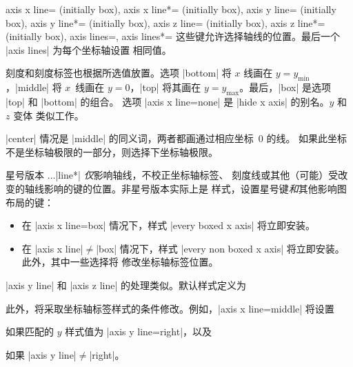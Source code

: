\begin{pgfplotskeylist}{%
    axis x line= (initially box),
    axis x line*= (initially box),
    axis y line= (initially box),
    axis y line*= (initially box),
    axis z line= (initially box),
    axis z line*= (initially box),
    axis lines=,
    axis lines*=%
}
    这些键允许选择轴线的位置。最后一个 |axis lines| 为每个坐标轴设置
    相同值。

    刻度和刻度标签也根据所选值放置。选项 |bottom| 将 $x$ 线画在
    $y=y_{\min}$，|middle| 将 $x$~线画在 $y=0$，|top| 将其画在
    $y=y_{\max}$。最后，|box| 是选项 |top| 和 |bottom| 的组合。
    选项 |axis x line=none| 是 |hide x axis| 的别名。$y$ 和 $z$ 变体
    类似工作。

    |center| 情况是 |middle| 的同义词，两者都画通过相应坐标~$0$ 的线。
    如果此坐标不是坐标轴极限的一部分，则选择下坐标轴极限。

    星号版本 $\dotsc$|line*| \emph{仅}影响轴线，不校正坐标轴标签、
    刻度线或其他（可能）受改变的轴线影响的键的位置。非星号版本实际上是
    样式，设置星号键\emph{和}其他影响图布局的键：
    \begin{itemize}
        \item 在 |axis x line=box| 情况下，样式 |every boxed x axis|
            将立即安装。
        \item 在 |axis x line|$\neq$|box| 情况下，样式
            |every non boxed x axis| 将立即安装。此外，其中一些选择将
            修改坐标轴标签位置。
    \end{itemize}
    |axis y line| 和 |axis z line| 的处理类似。默认样式定义为
\begin{codeexample}
\end{codeexample}
    此外，将采取坐标轴标签样式的条件修改。例如，|axis x line=middle|
    将设置
\begin{codeexample}
\end{codeexample}
    如果匹配的 $y$ 样式值为 |axis y line=right|，以及
\begin{codeexample}
\end{codeexample}
    如果 |axis y line|$\neq$|right|。


\end{pgfplotskeylist}
